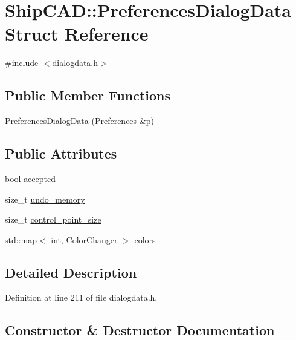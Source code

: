\hypertarget{structShipCAD_1_1PreferencesDialogData}{}\section{Ship\+C\+AD\+:\+:Preferences\+Dialog\+Data Struct Reference}
\label{structShipCAD_1_1PreferencesDialogData}


{\ttfamily \#include $<$dialogdata.\+h$>$}

\subsection*{Public Member Functions}
\begin{DoxyCompactItemize}
\item 
\hyperlink{structShipCAD_1_1PreferencesDialogData_ab08567115eb9f92d24da143ab87db224}{Preferences\+Dialog\+Data} (\hyperlink{classShipCAD_1_1Preferences}{Preferences} \&p)
\end{DoxyCompactItemize}
\subsection*{Public Attributes}
\begin{DoxyCompactItemize}
\item 
bool \hyperlink{structShipCAD_1_1PreferencesDialogData_a273da4c8a491252b81a8135888fd09b7}{accepted}
\item 
size\+\_\+t \hyperlink{structShipCAD_1_1PreferencesDialogData_a221dfa5e704ab65d7ea8552736738da2}{undo\+\_\+memory}
\item 
size\+\_\+t \hyperlink{structShipCAD_1_1PreferencesDialogData_a53ba0a8f8b1cf70ea78d1162703abc6c}{control\+\_\+point\+\_\+size}
\item 
std\+::map$<$ int, \hyperlink{structShipCAD_1_1ColorChanger}{Color\+Changer} $>$ \hyperlink{structShipCAD_1_1PreferencesDialogData_aefc358c8c80389053e1a3b2f333d6da9}{colors}
\end{DoxyCompactItemize}


\subsection{Detailed Description}


Definition at line 211 of file dialogdata.\+h.



\subsection{Constructor \& Destructor Documentation}
